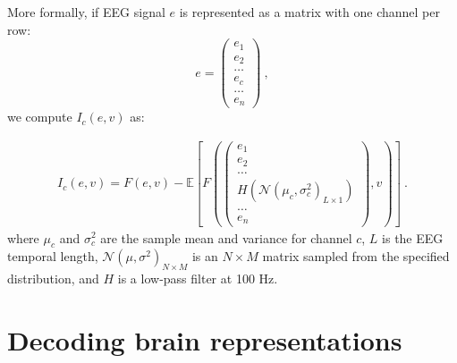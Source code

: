 \documentclass[10pt,journal,compsoc,twocolumn]{IEEEtran}
\begin{document}
More formally, if EEG signal $e$ is represented as a matrix with one channel per row:
\begin{equation}
e = \left( \begin{matrix} e_1 \\ e_2 \\ \dots \\ e_c \\ \dots \\ e_n \end{matrix} \right)~,
\end{equation}
we compute $I_c(e,v)$ as:

\begin{equation}
\begin{split}
I_c(e,v) = F(e,v) - \mathbb{E}\left[ F\left(\left( \begin{matrix} e_1 \\ e_2 \\ \dots \\ H\left(\mathcal{N}(\mu_c, \sigma^2_c)_{L \times 1}\right) \\ \dots \\ e_n \end{matrix}  \right), v\right) \right]~.
\end{split}
\end{equation}
where $\mu_c$ and $\sigma^2_c$ are the sample mean and variance for channel $c$, $L$ is the EEG temporal length, $\mathcal{N}(\mu, \sigma^2)_{N \times M}$ is an $N \times M$ matrix sampled from the specified distribution, and $H$ is a low-pass filter at 100 Hz. 

\section{Decoding brain representations}\label{sec:decoding}
\end{document}
